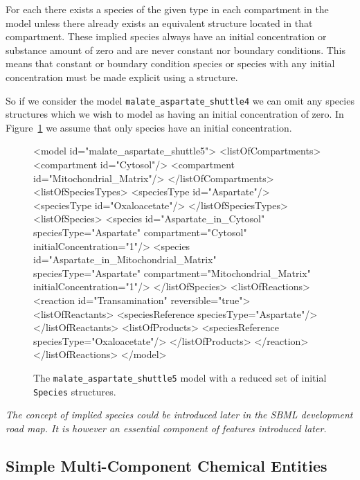 \documentclass{cekarticle}
\begin{document}
For each  there exists a species of the given
type in each compartment in the model unless there already exists
an equivalent  structure located in that
compartment.  These implied species always have an initial
concentration or substance amount of zero and are never constant
nor boundary conditions. This means that constant or boundary
condition species or species with any initial concentration must
be made explicit using a  structure.

So if we consider the model \texttt{malate\_aspartate\_shuttle4}
we can omit any species structures which we wish to model as
having an initial concentration of zero.   In
Figure~\ref{fig:malate_aspartate_shuttle5-xml} we assume that only
 species have an initial concentration.

\begin{figure}[h]
\begin{example}
<model id="malate_aspartate_shuttle5">
    <listOfCompartments>
        <compartment id="Cytosol"/>
        <compartment id="Mitochondrial_Matrix"/>
    </listOfCompartments>
    <listOfSpeciesTypes>
        <speciesType id="Aspartate"/>
        <speciesType id="Oxaloacetate"/>
    </listOfSpeciesTypes>
    <listOfSpecies>
        <species
            id="Aspartate_in_Cytosol"
            speciesType="Aspartate"
            compartment="Cytosol"
            initialConcentration="1"/>
        <species
            id="Aspartate_in_Mitochondrial_Matrix"
            speciesType="Aspartate"
            compartment="Mitochondrial_Matrix"
            initialConcentration="1"/>
    </listOfSpecies>
    <listOfReactions>
        <reaction id="Transamination" reversible="true">
            <listOfReactants>
                <speciesReference speciesType="Aspartate"/>
            </listOfReactants>
            <listOfProducts>
                <speciesReference speciesType="Oxaloacetate"/>
            </listOfProducts>
        </reaction>
    </listOfReactions>
</model>
\end{example}
\caption{The \texttt{malate\_aspartate\_shuttle5} model with a reduced set of initial \texttt{Species}
structures.}
\label{fig:malate_aspartate_shuttle5-xml}
\end{figure}


\emph{The concept of implied species could be introduced later in the SBML development road map.
It is however an essential component of features introduced later.}

\subsection{Simple Multi-Component Chemical Entities}
\label{sec:multicomponentspecies}
\end{document}
